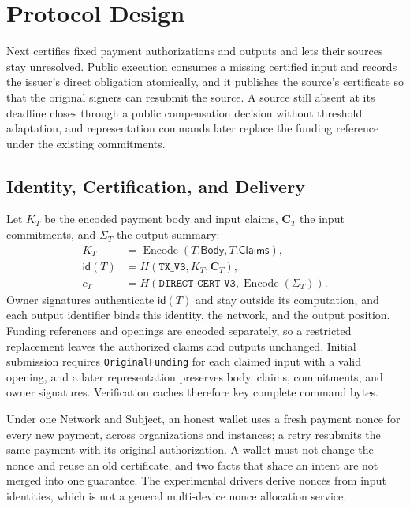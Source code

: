 
\section{Protocol Design}
\label{sec:protocol}

Next certifies fixed payment authorizations and outputs and lets their sources stay unresolved. Public execution consumes a missing certified input and records the issuer's direct obligation atomically, and it publishes the source's certificate so that the original signers can resubmit the source. A source still absent at its deadline closes through a public compensation decision without threshold adaptation, and representation commands later replace the funding reference under the existing commitments.

\subsection{Identity, Certification, and Delivery}
\label{sec:protocol-certification}

Let $K_T$ be the encoded payment body and input claims, $\mathbf{C}_T$ the input commitments, and $\Sigma_T$ the output summary:
\begin{equation}
  \begin{aligned}
    K_T &= \operatorname{Encode}(T.\mathsf{Body},T.\mathsf{Claims}),\\
    \mathsf{id}(T) &= H(\texttt{TX\_V3},K_T,\mathbf{C}_T),\\
    c_T &= H(\texttt{DIRECT\_CERT\_V3},\operatorname{Encode}(\Sigma_T)).
  \end{aligned}
  \label{eq:protocol-identities}
\end{equation}
Owner signatures authenticate $\mathsf{id}(T)$ and stay outside its computation, and each output identifier binds this identity, the network, and the output position. Funding references and openings are encoded separately, so a restricted replacement leaves the authorized claims and outputs unchanged. Initial submission requires \texttt{OriginalFunding} for each claimed input with a valid opening, and a later representation preserves body, claims, commitments, and owner signatures. Verification caches therefore key complete command bytes.

Under one Network and Subject, an honest wallet uses a fresh payment nonce for every new payment, across organizations and instances; a retry resubmits the same payment with its original authorization. A wallet must not change the nonce and reuse an old certificate, and two facts that share an intent are not merged into one guarantee. The experimental drivers derive nonces from input identities, which is not a general multi-device nonce allocation service.

